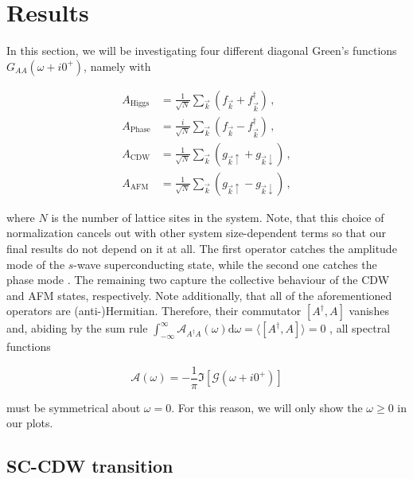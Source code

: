 \documentclass[
    reprint, 
    aps,
    preprintnumbers,
    twocolumn,
    prb,
    superscriptaddress
]{revtex4-2}
\newcommand{\vk}{\vec{k}}
\newcommand{\up}{\uparrow}
\newcommand{\down}{\downarrow}
\begin{document}
\section{Results}\label{sec:results}

In this section, we will be investigating four different diagonal Green's functions $G_{AA}(\omega + i0^+)$, namely with

\begin{subequations}
    \label{eqn:resolvent_bases}
    \begin{align}
        A_\text{Higgs} &= \frac{1}{\sqrt{N}} \sum_{\vk} \left( f_{\vk} + f_{\vk}^\dagger \right)\,,\\
        A_\text{Phase} &= \frac{i}{\sqrt{N}} \sum_{\vk} \left( f_{\vk} - f_{\vk}^\dagger \right)\,,\\
        A_\text{CDW} &= \frac{1}{\sqrt{N}} \sum_{\vk} \left( g_{\vk \up} + g_{\vk \down} \right)\,,\\
        A_\text{AFM} &= \frac{1}{\sqrt{N}} \sum_{\vk} \left( g_{\vk \up} - g_{\vk \down} \right)\,,
    \end{align}
\end{subequations}

where $N$ is the number of lattice sites in the system. 
Note, that this choice of normalization cancels out with other system size-dependent terms so that our final results do not depend on it at all.
The first operator catches the amplitude mode of the $s$-wave superconducting state, while the second one catches the phase mode \cite{Fan22}.
The remaining two capture the collective behaviour of the CDW and AFM states, respectively.
\newline
Note additionally, that all of the aforementioned operators are (anti-)Hermitian. 
Therefore, their commutator $[A^\dagger, A]$ vanishes and, 
abiding by the sum rule $\int_{-\infty}^\infty \mathcal{A}_{A^\dagger A} (\omega) \mathrm{d}\omega = \langle [A^\dagger, A] \rangle = 0$ \cite{rickayzen80},
all spectral functions

\begin{equation}
    \mathcal{A}(\omega) = -\frac{1}{\pi} \Im \left[ \mathcal{G}(\omega + i0^+) \right]
\end{equation}

must be symmetrical about $\omega=0$.
For this reason, we will only show the $\omega \geq 0$ in our plots. 

\subsection{SC-CDW transition}
\end{document}
